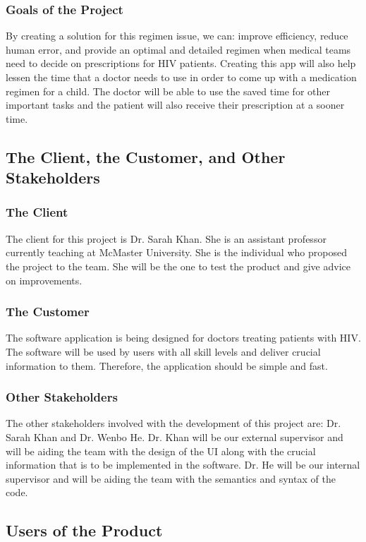 \documentclass[12pt]{article}
\begin{document}
\subsubsection{Goals of the Project}
By creating a solution for this regimen issue, we can: improve efficiency, reduce human error, and provide an optimal and detailed regimen when medical teams need to decide on prescriptions for HIV patients. Creating this app will also help lessen the time that a doctor needs to use in order to come up with a medication regimen for a child. The doctor will be able to use the saved time for other important tasks and the patient will also receive their prescription at a sooner time.

\subsection{The Client, the Customer, and Other Stakeholders}
\subsubsection{The Client}
The client for this project is Dr. Sarah Khan. She is an assistant professor currently teaching at McMaster University. She is the individual who proposed the project to the team. She will be the one to test the product and give advice on improvements.
\subsubsection{The Customer}
The software application is being designed for doctors treating patients with HIV. The software will be used by users with all skill levels and deliver crucial information to them. Therefore, the application should be simple and fast.
\subsubsection{Other Stakeholders}
The other stakeholders involved with the development of this project are: Dr. Sarah Khan and Dr. Wenbo He. Dr. Khan will be our external supervisor and will be aiding the team with the design of the UI along with the crucial information that is to be implemented in the software. Dr. He will be our internal supervisor and will be aiding the team with the semantics and syntax of the code.

\subsection{Users of the Product}
\end{document}
